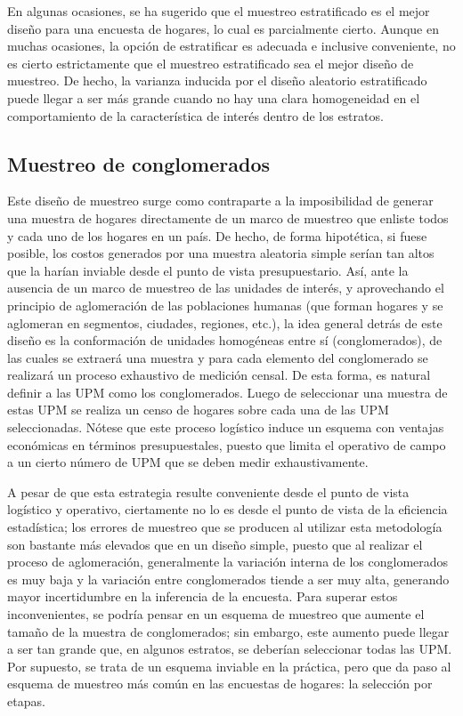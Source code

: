 \documentclass[
  10pt,
  spanish,
]{book}
\begin{document}
En algunas ocasiones, se ha sugerido que el muestreo estratificado es el mejor diseño para una encuesta de hogares, lo cual es parcialmente cierto. Aunque en muchas ocasiones, la opción de estratificar es adecuada e inclusive conveniente, no es cierto estrictamente que el muestreo estratificado sea el mejor diseño de muestreo. De hecho, la varianza inducida por el diseño aleatorio estratificado puede llegar a ser más grande cuando no hay una clara homogeneidad en el comportamiento de la característica de interés dentro de los estratos.

\hypertarget{muestreo-de-conglomerados}{%
\subsection*{Muestreo de conglomerados}\label{muestreo-de-conglomerados}}

Este diseño de muestreo surge como contraparte a la imposibilidad de generar una muestra de hogares directamente de un marco de muestreo que enliste todos y cada uno de los hogares en un país. De hecho, de forma hipotética, si fuese posible, los costos generados por una muestra aleatoria simple serían tan altos que la harían inviable desde el punto de vista presupuestario. Así, ante la ausencia de un marco de muestreo de las unidades de interés, y aprovechando el principio de aglomeración de las poblaciones humanas (que forman hogares y se aglomeran en segmentos, ciudades, regiones, etc.), la idea general detrás de este diseño es la conformación de unidades homogéneas entre sí (conglomerados), de las cuales se extraerá una muestra y para cada elemento del conglomerado se realizará un proceso exhaustivo de medición censal. De esta forma, es natural definir a las UPM como los conglomerados. Luego de seleccionar una muestra de estas UPM se realiza un censo de hogares sobre cada una de las UPM seleccionadas. Nótese que este proceso logístico induce un esquema con ventajas económicas en términos presupuestales, puesto que limita el operativo de campo a un cierto número de UPM que se deben medir exhaustivamente.

A pesar de que esta estrategia resulte conveniente desde el punto de vista logístico y operativo, ciertamente no lo es desde el punto de vista de la eficiencia estadística; los errores de muestreo que se producen al utilizar esta metodología son bastante más elevados que en un diseño simple, puesto que al realizar el proceso de aglomeración, generalmente la variación interna de los conglomerados es muy baja y la variación entre conglomerados tiende a ser muy alta, generando mayor incertidumbre en la inferencia de la encuesta. Para superar estos inconvenientes, se podría pensar en un esquema de muestreo que aumente el tamaño de la muestra de conglomerados; sin embargo, este aumento puede llegar a ser tan grande que, en algunos estratos, se deberían seleccionar todas las UPM. Por supuesto, se trata de un esquema inviable en la práctica, pero que da paso al esquema de muestreo más común en las encuestas de hogares: la selección por etapas.
\end{document}
